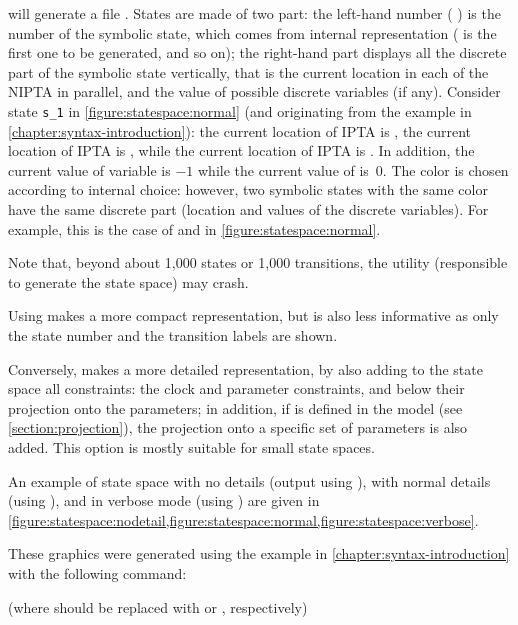 \imitator{} will generate a file .
States are made of two part: the left-hand number (\eg{} ) is the number of the symbolic state, which comes from \imitator{} internal representation ( is the first one to be generated, and so on); the right-hand part displays all the discrete part of the symbolic state vertically, that is the current location in each of the NIPTA in parallel, and the value of possible discrete variables (if any).
Consider state \texttt{s\_1} in \cref{figure:statespace:normal} (and originating from the example in \cref{chapter:syntax-introduction}):
the current location of IPTA  is ,
the current location of IPTA  is ,
while
the current location of IPTA  is .
In addition, the current value of variable  is $-1$ while the current value of  is~0.
The color is chosen according to \imitator{} internal choice: however, two symbolic states with the same color have the same discrete part (location and values of the discrete variables).
For example, this is the case of  and  in \cref{figure:statespace:normal}.

Note that, beyond about 1,000 states or 1,000 transitions, the \gdot{} utility (responsible to generate the state space) may crash.

Using  makes a more compact representation, but is also less informative as only the state number and the transition labels are shown.

Conversely,  makes a more detailed representation, by also adding to the state space all constraints:
the clock and parameter constraints, and below their projection onto the parameters; in addition, if  is defined in the model (see \cref{section:projection}), the projection onto a specific set of parameters is also added.
This option is mostly suitable for small state spaces.

\begin{example}
	An example of state space with no details (output using ), with normal details (using ), and in verbose mode (using ) are given in \cref{figure:statespace:nodetail,figure:statespace:normal,figure:statespace:verbose}.

	These graphics were generated using the example in \cref{chapter:syntax-introduction} with the following command:


	(where  should be replaced with  or , respectively)
\end{example}

